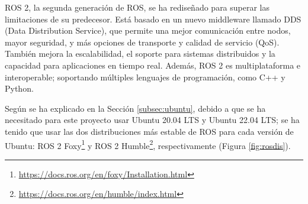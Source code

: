 ROS 2, la segunda generación de ROS, se ha rediseñado para superar las limitaciones de su predecesor. Está basado en un nuevo middleware llamado DDS (Data Distribution Service), que permite una mejor comunicación entre nodos, mayor seguridad, y más opciones de transporte y calidad de servicio (QoS). También mejora la escalabilidad, el soporte para sistemas distribuidos y la capacidad para aplicaciones en tiempo real. Además, ROS 2 es multiplataforma e interoperable; soportando múltiples lenguajes de programación, como C++ y Python.



Según se ha explicado en la Sección \ref{subsec:ubuntu}, debido a que se ha necesitado para este proyecto usar Ubuntu 20.04 LTS y Ubuntu 22.04 LTS; se ha tenido que usar las dos distribuciones más estable de ROS para cada versión de Ubuntu: ROS 2 Foxy\footnote{\url{https://docs.ros.org/en/foxy/Installation.html}} y ROS 2 Humble\footnote{\url{https://docs.ros.org/en/humble/index.html}}, respectivamente (Figura \ref{fig:rosdis}).


